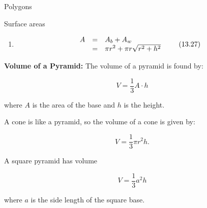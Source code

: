 \begin{exercises}{Polygons}
\begin{exercises}{Surface areas }
{\begin{mdframed}[linewidth=4, leftmargin=40, rightmargin=40]
\begin{exercise}
\begin{enumerate}[noitemsep, label=\textbf{Step} \textbf{\arabic*}. ]
      
      \item  
      \label{m39357*id63035}\nopagebreak\noindent{}
        
    \begin{equation}
    \begin{array}{ccc}\hfill A& =& {A}_{b}+{A}_{w}\hfill \\ & =& \pi {r}^{2}+\pi r\sqrt{{r}^{2}+{h}^{2}}\hfill \end{array}\tag{13.27}
      \end{equation}
    
      
      
      \end{enumerate}
         

    \end{exercise}
    \end{mdframed}
    }
    \noindent
  
      \label{m39357*id63137}\textbf{Volume of a Pyramid:} The volume of a pyramid is found by:\par 
      \label{m39357*id63144}\nopagebreak\noindent{}
        
    \begin{equation}
    V=\frac{1}{3}A\ensuremath{\cdot}h\tag{13.28}
      \end{equation}
    
      
      \label{m39357*id63170}where $A$ is the area of the base and $h$ is the height.\par 
      \label{m39357*id63191}A cone is like a pyramid, so the volume of a cone is given by:\par 
      \label{m39357*id63195}\nopagebreak\noindent{}
        
    \begin{equation}
    V=\frac{1}{3}\pi {r}^{2}h.\tag{13.29}
      \end{equation}
    
      
      \label{m39357*id62104}A square pyramid has volume\par 
      \label{m39357*id62107}\nopagebreak\noindent{}
        
    \begin{equation}
    V=\frac{1}{3}{a}^{2}h\tag{13.30}
      \end{equation}
    
      
      \label{m39357*id63440}where $a$ is the side length of the square base.\par 
\label{m39357*secfhsst!!!underscore!!!id330}\vspace{.5cm} 
      

\end{exercises}
\end{exercises}
